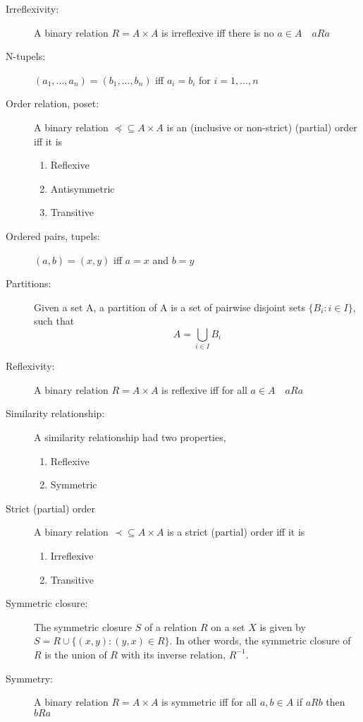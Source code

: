 \documentclass[12pt]{article}
\begin{document}
\begin{description}
\item[Irreflexivity:] A binary relation $R = A \times A$ is irreflexive iff there is no $a \in A  \quad aRa$

\item[N-tupels:] $(a_1,...,a_n) = (b_1,...,b_n)$ iff $a_i = b_i$ for $i = 1,...,n$

\item[Order relation, poset:] A binary relation $\preceq \subseteq A \times A$ is an (inclusive or non-strict) (partial) order iff it is
\begin{enumerate}
	\item Reflexive
	\item Antisymmetric
	\item Transitive
	\end{enumerate}	

\item[Ordered pairs, tupels:] $(a,b) = (x,y)$ iff $a = x$ and $b = y$

\item[Partitions:] Given a set A, a partition of A is a set of pairwise disjoint sets
$\{B_i : i \in I \}$, such that \[ A = \bigcup_{i \in I} B_i\]

\item[Reflexivity:] A binary relation $R = A \times A$ is reflexive iff for all $a \in A  \quad aRa$

\item[Similarity relationship:] A similarity relationship had two properties,
	\begin{enumerate}
	\item Reflexive
	\item Symmetric
	\end{enumerate}	 
	
\item[Strict (partial) order] A binary relation $\prec \subseteq A \times A$ is a strict (partial) order iff it is
\begin{enumerate}
	\item Irreflexive
	\item Transitive
	\end{enumerate}		

\item[Symmetric closure:]The symmetric closure $S$ of a relation $R$ on a set $X$ is given by $S = R \cup \{(x,y): (y,x) \in R\}$. In other words, the symmetric closure of $R$ is the union of $R$ with its inverse relation, $R^{-1}$.
	
\item[Symmetry:] A binary relation $R = A \times A$ is symmetric iff for all $a,b \in A $ if $aRb$ then $bRa$	


\end{description}
\end{document}
